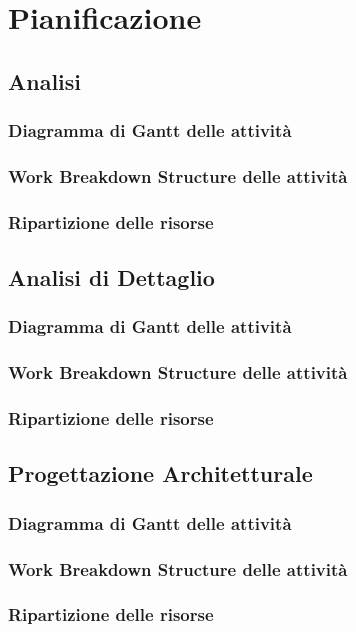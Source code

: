 \section{Pianificazione}
\subsection{Analisi}
\subsubsection{Diagramma di Gantt delle attività}
\subsubsection{Work Breakdown Structure delle attività}
\subsubsection{Ripartizione delle risorse}
\subsection{Analisi di Dettaglio}
\subsubsection{Diagramma di Gantt delle attività}
\subsubsection{Work Breakdown Structure delle attività}
\subsubsection{Ripartizione delle risorse}
\subsection{Progettazione Architetturale}
\subsubsection{Diagramma di Gantt delle attività}
\subsubsection{Work Breakdown Structure delle attività}
\subsubsection{Ripartizione delle risorse}
